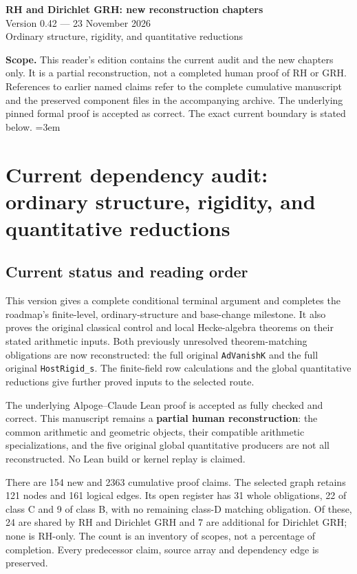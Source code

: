 \documentclass[11pt,a4paper]{article}
\numberwithin{equation}{section}
\theoremstyle{remark}\newtheorem{remark}[theorem]{Remark}
\begin{document}
\begin{center}
{\LARGE\bfseries RH and Dirichlet GRH: new reconstruction chapters}\\[7pt]
{\large Version 0.42 --- 23 November 2026}\\[5pt]
{\large Ordinary structure, rigidity, and quantitative reductions}
\end{center}
\textbf{Scope.} This reader's edition contains the current audit and
the new chapters only. It is a partial reconstruction, not a completed
human proof of RH or GRH. References to earlier named claims refer to
the complete cumulative manuscript and the preserved component files
in the accompanying archive. The underlying pinned formal proof is
accepted as correct. The exact current boundary is stated below.
\setcounter{tocdepth}{1}
\tableofcontents
\clearpage
\begingroup\emergencystretch=3em
\section{Current dependency audit: ordinary structure, rigidity, and quantitative reductions}
\label{sec:dependency-audit-v42}

\subsection{Current status and reading order}

This version gives a complete conditional terminal argument and completes
the roadmap's finite-level, ordinary-structure and base-change milestone.
It also proves the original classical control and local Hecke-algebra
theorems on their stated arithmetic inputs. Both previously unresolved
theorem-matching obligations are now reconstructed: the full original
\texttt{Ad\allowbreak Vanish\allowbreak K} and the full original \texttt{Host\allowbreak Rigid\_\allowbreak s}.
The finite-field row calculations and the global quantitative reductions
give further proved inputs to the selected route.

The underlying Alpoge--Claude Lean proof is accepted as fully checked and
correct. This manuscript remains a \textbf{partial human reconstruction}:
the common arithmetic and geometric objects, their compatible arithmetic
specializations, and the five original global quantitative producers are
not all reconstructed. No Lean build or kernel replay is claimed.

There are 154 new and 2363 cumulative proof claims. The selected graph
retains 121 nodes and 161 logical edges. Its open register has 31
whole obligations, 22 of class C and 9 of class B, with no remaining
class-D matching obligation. Of these, 24 are shared by RH and
Dirichlet GRH and 7 are additional for Dirichlet GRH; none is RH-only.
The count is an inventory of scopes, not a percentage of completion.
Every predecessor claim, source array and dependency edge is preserved.
\end{document}
